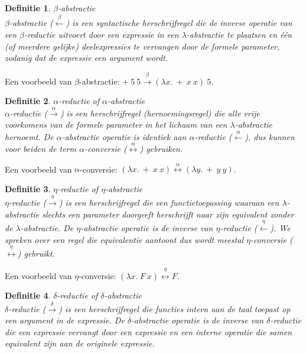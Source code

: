 \documentclass[a4paper]{article}
\newtheorem{tdefinitie}{Definitie}[section]
\newenvironment{definitie}[1]%
  {\begin{mdframed}[backgroundcolor=silver,
    topline=false,
    rightline=false,
    leftline=false,
    bottomline=false]\begin{tdefinitie}#1\\\normalfont}%
  {\end{tdefinitie}\end{mdframed}}
\begin{document}
\begin{definitie}{$\beta$-abstractie}
  $\beta$-abstractie ($\stackrel{\beta}{\longleftarrow}$) is een syntactische herschrijfregel die de inverse operatie van een $\beta$-reductie uitvoert door een expressie in een $\lambda$-abstractie te plaatsen en \'e\'en (of meerdere gelijke) deelexpressies te vervangen door de formele parameter, zodanig dat de expressie een argument wordt.
\end{definitie}

Een voorbeeld van $\beta$-abstractie: $+\ 5\ 5 \stackrel{\beta}{\longrightarrow} (\lambda x.\ +\ x\ x)\ 5$.

\begin{definitie}{$\alpha$-reductie of $\alpha$-abstractie}
  $\alpha$-reductie ($\stackrel{\alpha}{\longrightarrow}$) is een herschrijfregel (hernoemingsregel) die alle vrije voorkomens van de formele parameter in het lichaam van een $\lambda$-abstractie hernoemt. De $\alpha$-abstractie operatie is identiek aan $\alpha$-reductie ($\stackrel{\alpha}{\longleftarrow}$), dus kunnen voor beiden de term $\alpha$-conversie ($\stackrel{\alpha}{\longleftrightarrow}$) gebruiken.
\end{definitie}

Een voorbeeld van $\alpha$-conversie: $(\lambda x.\ +\ x\ x) \stackrel{\alpha}{\longleftrightarrow} (\lambda y.\ +\ y\ y)$.

\begin{definitie}{$\eta$-reductie of $\eta$-abstractie}
  $\eta$-reductie ($\stackrel{\eta}{\longrightarrow}$) is een herschrijfregel die een functietoepassing waaraan een $\lambda$-abstractie slechts een parameter doorgeeft herschrijft naar zijn equivalent zonder de $\lambda$-abstractie. De $\eta$-abstractie operatie is de inverse van $\eta$-reductie ($\stackrel{\eta}{\longleftarrow}$). We spreken over een regel die equivalentie aantoont dus wordt meestal $\eta$-conversie ($\stackrel{\eta}{\longleftrightarrow}$) gebruikt.
\end{definitie}

Een voorbeeld van $\eta$-conversie: $(\lambda x.\ F\ x) \stackrel{\eta}{\longleftrightarrow} F$.


\begin{definitie}{$\delta$-reductie of $\delta$-abstractie}
  $\delta$-reductie ($\stackrel{\delta}{\longrightarrow}$) is een herschrijfregel die functies intern aan de taal toepast op een argument in de expressie. De $\delta$-abstractie operatie is de inverse van $\delta$-reductie die een expressie vervangt door een expressie en een interne operatie die samen equivalent zijn aan de originele expressie.
\end{definitie}
\end{document}
